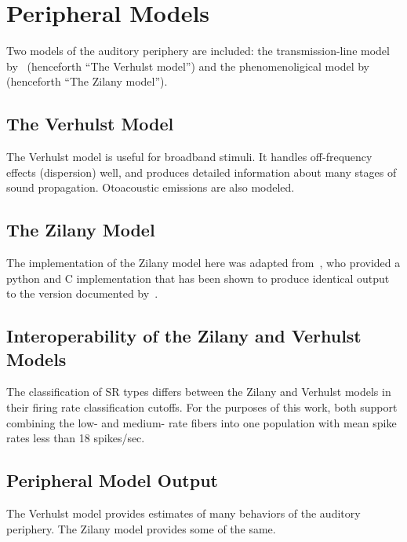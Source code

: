 
\section{Peripheral Models} %
\label{sec:peripheral_models}
Two models of the auditory periphery are included: the transmission-line model by~\cite{Verhulst2015Functional} (henceforth ``The Verhulst model'') and the phenomenoligical model by~\cite{Zilany2014Updated} (henceforth ``The Zilany model'').

\subsection{The Verhulst Model} %
\label{sub:the_verhulst_model1}
The Verhulst model is useful for broadband stimuli.  It handles off-frequency effects (dispersion) well, and produces detailed information about many stages of sound propagation.  Otoacoustic emissions are also modeled. 
\subsection{The Zilany Model} %
\label{sub:the_zilany_model}
The implementation of the Zilany model here was adapted from~\cite{Rudnicki2014Cochlea}, who provided a python and C implementation that has been shown to produce identical output to the version documented by~\cite{Zilany2014Updated}. 

\subsection{Interoperability of the Zilany and Verhulst Models} %
\label{sub:interoperability_of_the_zilany_and_verhulst_models}
The classification of SR types differs between the Zilany and Verhulst models in their firing rate classification cutoffs.  For the purposes of this work, both support combining the low- and medium- rate fibers into one population with mean spike rates less than 18 spikes/sec.  

\subsection{Peripheral Model Output} %
\label{sub:peripheral_model_output}
The Verhulst model provides estimates of many behaviors of the auditory periphery.  The Zilany model provides some of the same. 

